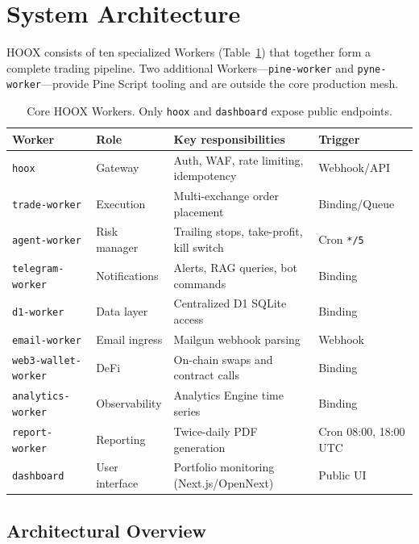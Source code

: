 \section{System Architecture}
\label{sec:architecture}

\textsc{HOOX} consists of ten specialized Workers (Table~\ref{tab:workers}) that together form a complete trading pipeline. Two additional Workers---\texttt{pine-worker} and \texttt{pyne-worker}---provide Pine Script tooling and are outside the core production mesh.

\begin{table}[t]
  \centering
  \caption{Core \textsc{HOOX} Workers. Only \texttt{hoox} and \texttt{dashboard} expose public endpoints.}
  \label{tab:workers}
  \small
  \begin{tabular*}{\linewidth}{@{\extracolsep{\fill}}llp{5.5cm}l@{}}
    \toprule
    \textbf{Worker} & \textbf{Role} & \textbf{Key responsibilities} & \textbf{Trigger} \\
    \midrule
    \texttt{hoox} & Gateway & Auth, WAF, rate limiting, idempotency & Webhook/API \\
    \texttt{trade-worker} & Execution & Multi-exchange order placement & Binding/Queue \\
    \texttt{agent-worker} & Risk manager & Trailing stops, take-profit, kill switch & Cron \texttt{*/5} \\
    \texttt{telegram-worker} & Notifications & Alerts, RAG queries, bot commands & Binding \\
    \texttt{d1-worker} & Data layer & Centralized D1 SQLite access & Binding \\
    \texttt{email-worker} & Email ingress & Mailgun webhook parsing & Webhook \\
    \texttt{web3-wallet-worker} & DeFi & On-chain swaps and contract calls & Binding \\
    \texttt{analytics-worker} & Observability & Analytics Engine time series & Binding \\
    \texttt{report-worker} & Reporting & Twice-daily PDF generation & Cron 08:00, 18:00 UTC \\
    \texttt{dashboard} & User interface & Portfolio monitoring (Next.js/OpenNext) & Public UI \\
    \bottomrule
  \end{tabular*}
\end{table}

\subsection{Architectural Overview}

